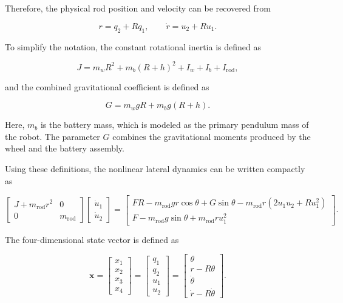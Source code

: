 Therefore, the physical rod position and velocity can be recovered from

\begin{equation}
r=q_2+Rq_1,
\qquad
\dot{r}=u_2+Ru_1.
\label{eq:rod-position-recovery}
\end{equation}

To simplify the notation, the constant rotational inertia is defined as

\begin{equation}
J
=
m_wR^2
+
m_b(R+h)^2
+
I_w
+
I_b
+
I_{\mathrm{rod}},
\label{eq:constant-J}
\end{equation}

and the combined gravitational coefficient is defined as

\begin{equation}
G
=
m_wgR
+
m_bg(R+h).
\label{eq:constant-G}
\end{equation}

Here, $m_b$ is the battery mass, which is modeled as the primary pendulum mass of the robot. The parameter $G$ combines the gravitational moments produced by the wheel and the battery assembly.

Using these definitions, the nonlinear lateral dynamics can be written compactly as

\begin{equation}
\begin{bmatrix}
J+m_{\mathrm{rod}}r^2 & 0 \\
0 & m_{\mathrm{rod}}
\end{bmatrix}
\begin{bmatrix}
\dot{u}_1 \\
\dot{u}_2
\end{bmatrix}
=
\begin{bmatrix}
FR
-m_{\mathrm{rod}}gr\cos\theta
+G\sin\theta
-m_{\mathrm{rod}}r
\left(
2u_1u_2+Ru_1^2
\right)
\\[6pt]
F
-m_{\mathrm{rod}}g\sin\theta
+m_{\mathrm{rod}}ru_1^2
\end{bmatrix}.
\label{eq:simplified-lateral-model}
\end{equation}

The four-dimensional state vector is defined as

\begin{equation}
\mathbf{x}
=
\begin{bmatrix}
x_1 \\
x_2 \\
x_3 \\
x_4
\end{bmatrix}
=
\begin{bmatrix}
q_1 \\
q_2 \\
u_1 \\
u_2
\end{bmatrix}
=
\begin{bmatrix}
\theta \\
r-R\theta \\
\dot{\theta} \\
\dot{r}-R\dot{\theta}
\end{bmatrix}.
\label{eq:lateral-state-vector}
\end{equation}


